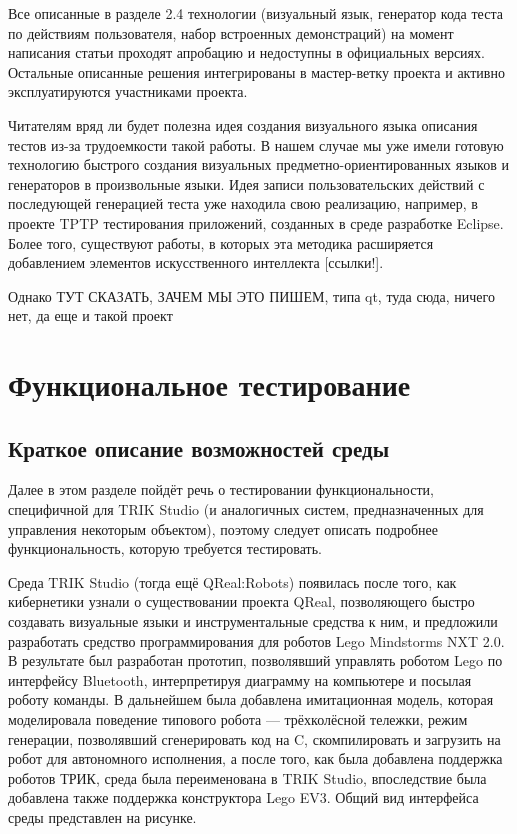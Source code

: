 ﻿\documentclass[conference]{IEEEtran}
\begin{document}
Все описанные в разделе 2.4 технологии (визуальный язык, генератор кода теста по действиям 
пользователя, набор встроенных демонстраций) на момент написания статьи проходят апробацию 
и недоступны в официальных версиях. Остальные описанные решения интегрированы в мастер-ветку 
проекта и активно эксплуатируются участниками проекта.

Читателям вряд ли будет полезна идея создания визуального языка описания тестов из-за 
трудоемкости такой работы. В нашем случае мы уже имели готовую технологию быстрого 
создания визуальных предметно-ориентированных языков и генераторов в произвольные языки. 
Идея записи пользовательских действий с последующей генерацией теста уже находила 
свою реализацию, например, в проекте TPTP тестирования приложений, созданных в среде 
разработке Eclipse. Более того, существуют работы, в которых эта методика расширяется 
добавлением элементов искусственного интеллекта [ссылки!].

Однако {ТУТ СКАЗАТЬ, ЗАЧЕМ МЫ ЭТО ПИШЕМ, типа qt, туда сюда, ничего нет, да еще и такой проект}

\section{Функциональное тестирование}
\subsection{Краткое описание возможностей среды}
Далее в этом разделе пойдёт речь о тестировании функциональности, специфичной для 
TRIK Studio (и аналогичных систем, предназначенных для управления некоторым объектом), 
поэтому следует описать подробнее функциональность, которую требуется тестировать. 

Среда TRIK Studio (тогда ещё QReal:Robots) появилась после того, как кибернетики узнали 
о существовании проекта QReal, позволяющего быстро создавать визуальные языки и инструментальные 
средства к ним, и предложили разработать средство программирования для роботов Lego Mindstorms NXT 2.0. 
В результате был разработан прототип, позволявший управлять роботом Lego по интерфейсу 
Bluetooth, интерпретируя диаграмму на компьютере и посылая роботу команды. В дальнейшем 
была добавлена имитационная модель, которая моделировала поведение типового робота --- 
трёхколёсной тележки, режим генерации, позволявший сгенерировать код на C, скомпилировать 
и загрузить на робот для автономного исполнения, а после того, как была добавлена 
поддержка роботов ТРИК, среда была переименована в TRIK Studio, впоследствие была добавлена 
также поддержка конструктора Lego EV3. Общий вид интерфейса среды представлен на рисунке.
\end{document}
